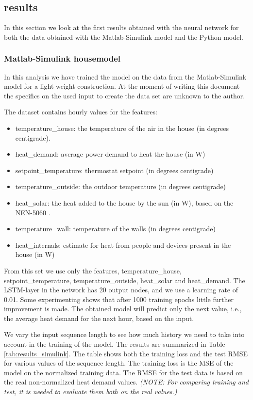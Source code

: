 \subsection{results}
In this section we look at the first results obtained with the neural network for both the data obtained with the Matlab-Simulink model and the Python model. 



\subsubsection{Matlab-Simulink housemodel}
In this analysis we have trained the model on the data from the Matlab-Simulink model for a light weight construction.  
At the moment of writing this document the specifics on the used input to create the data set are unknown to the author. 

The dataset contains hourly values for the features:
\begin{itemize}
\item temperature\_house: the temperature of the air in the house (in degrees centigrade). 
\item heat\_demand: average power demand to heat the house (in W)
\item setpoint\_temperature: thermostat setpoint (in degrees centigrade)
\item temperature\_outside: the outdoor temperature (in degrees centigrade)
\item heat\_solar: the heat added to the house by the sun (in W), based on the NEN-5060 \cite{NEN5060}. 
\item temperature\_wall: temperature of the walls (in degrees centigrade)
\item heat\_internals: estimate for heat from people and devices present in the house (in W) 
\end{itemize}

From this set we use only the features, temperature\_house, setpoint\_temperature, temperature\_outside, heat\_solar and heat\_demand. 
The LSTM-layer in the network has 20 output nodes, and we use a learning rate of 0.01. Some experimenting shows that after 1000 training epochs little further improvement is made. The obtained model will predict only the next value, i.e., the average heat demand for the next hour, based on the input. 

We vary the input sequence length to see how much history we need to take into account in the training of the model. The results are summarized in Table \ref{tab:results_simulink}. The table shows both the training loss and the test RMSE for various values of the sequence length. The training loss is the MSE of the model on the normalized training data. The RMSE for the test data is based on the real non-normalized heat demand values. \textit{(NOTE: For comparing training and test, it is needed to evaluate them both on the real values.)}

